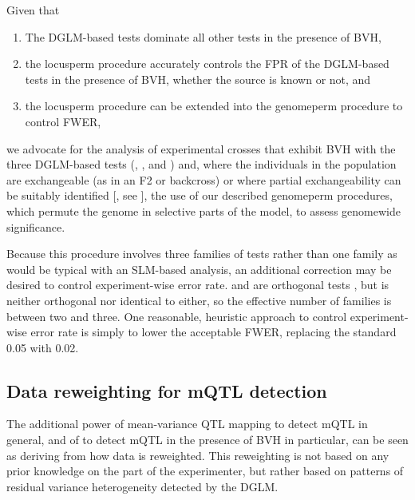 Given that 
\begin{enumerate}
	\item The DGLM-based tests dominate all other tests in the presence of BVH,
	\item the locusperm procedure accurately controls the FPR of the DGLM-based tests in the presence of BVH, whether the source is known or not, and
	\item the locusperm procedure can be extended into the genomeperm procedure to control FWER,
\end{enumerate}
we advocate for the analysis of experimental crosses that exhibit BVH with the three DGLM-based tests (\DGLMm, \DGLMv, and \DGLMmv) and, where the individuals in the population are exchangeable (as in an F2 or backcross) or where partial exchangeability can be suitably identified [\eg, see \citep{Churchill1994,Zou2006,Churchill2008}], the use of our described genomeperm procedures, which permute the genome in selective parts of the model, to assess genomewide significance.

Because this procedure involves three families of tests rather than one family as would be typical with an SLM-based analysis, an additional correction may be desired to control experiment-wise error rate.
\DGLMm and \DGLMv are orthogonal tests \citep{Smyth1989}, but \DGLMmv is neither orthogonal nor identical to either, so the effective number of families is between two and three.
One reasonable, heuristic approach to control experiment-wise error rate is simply to lower the acceptable FWER, \eg replacing the standard 0.05 with 0.02.

\subsection{Data reweighting for mQTL detection}
The additional power of mean-variance QTL mapping to detect mQTL in general, and of \DGLMm to detect mQTL in the presence of BVH in particular, can be seen as deriving from how data is reweighted.
This reweighting is not based on any prior knowledge on the part of the experimenter, but rather based on patterns of residual variance heterogeneity detected by the DGLM.

